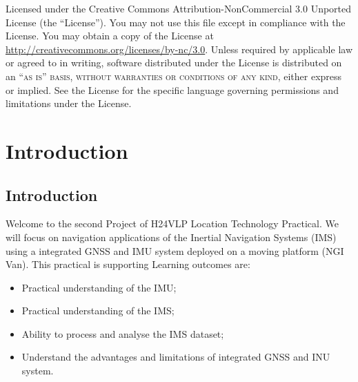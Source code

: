 \documentclass[11pt,fleqn]{book} %
\begin{document}
\noindent Licensed under the Creative Commons Attribution-NonCommercial 3.0 Unported License (the ``License''). You may not use this file except in compliance with the License. You may obtain a copy of the License at \url{http://creativecommons.org/licenses/by-nc/3.0}. Unless required by applicable law or agreed to in writing, software distributed under the License is distributed on an \textsc{``as is'' basis, without warranties or conditions of any kind}, either express or implied. See the License for the specific language governing permissions and limitations under the License.\\ %



\pagestyle{empty} %
\tableofcontents %

\cleardoublepage %
\pagestyle{fancy} %


\part{Introduction}



\chapter{Introduction}

Welcome to the second Project of H24VLP Location Technology Practical. We will focus on navigation applications of the Inertial Navigation Systems (IMS) using a integrated GNSS and IMU system deployed on a moving platform (NGI Van). This practical is supporting Learning outcomes are:

\begin{itemize}
	\item Practical understanding of the IMU;
	\item Practical understanding of the IMS;
	\item Ability to process and analyse the IMS dataset;
	\item Understand the advantages and limitations of integrated GNSS and INU system.

\end{itemize}
\end{document}
